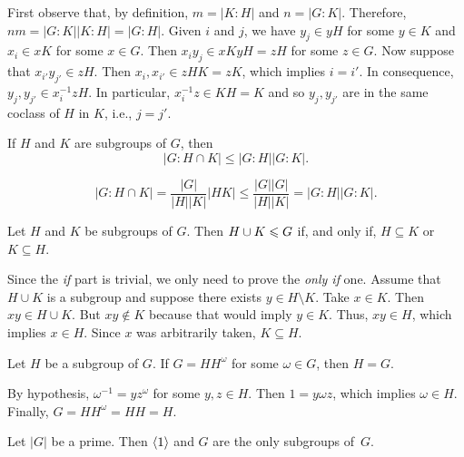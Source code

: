 \begin{solution}
    First observe that, by definition, $m=|K:H|$ and $n=|G:K|$. Therefore, $nm=|G:K||K:H|=|G:H|$. Given $i$ and $j$, we have $y_j\in yH$ for some $y\in K$ and $x_i\in xK$ for some $x\in G$. Then $x_iy_j\in xKyH=zH$ for some $z\in G$. Now suppose that $x_{i'}y_{j'}\in zH$. Then $x_i,x_{i'}\in zHK=zK$, which implies $i=i'$. In consequence, $y_j,y_{j'}\in x_i^{-1}zH$. In particular, $x_i^{-1}z\in KH=K$ and so $y_j,y_{j'}$ are in the same coclass of $H$ in $K$, i.e., $j=j'$.
\end{solution}

\begin{exr}
    If\/ $H$ and\/ $K$ are subgroups of\/ $G$, then
    $$
        |G:H\cap K|\le|G:H||G:K|.
    $$
\end{exr}

\begin{solution}
$$
    |G:H\cap K| = \frac{|G|}{|H||K|}|HK| \le \frac{|G||G|}{|H||K|}=|G:H||G:K|.
$$
 \end{solution}

\begin{exr}\label{exercise-1.1.4}
    Let\/ $H$ and\/ $K$ be subgroups of\/ $G$. Then\/ $H\cup K\leqslant G$ if, and only if,\/ $H\subseteq K$ or\/ $K\subseteq H$. 
\end{exr}

\begin{solution} Since the \textit{if\/} part is trivial, we only need to prove the \textit{only if\/} one. Assume that $H\cup K$ is a subgroup and suppose there exists $y\in H\setminus K$. Take $x\in K$. Then $xy\in H\cup K$. But $xy\notin K$ because that would imply $y\in K$. Thus, $xy\in H$, which implies $x\in H$. Since $x$ was arbitrarily taken, $K\subseteq H$.
\end{solution}

\begin{exr}\label{exercise-1.1.5}
    Let\/ $H$ be a subgroup of\/ $G$. If\/ $G=HH^\omega$ for some\/ $\omega\in G$, then\/ $H=G$.
\end{exr}

\begin{solution} By hypothesis, $\omega^{-1}=yz^\omega$ for some $y,z\in H$. Then $1=y\omega z$, which implies $\omega\in H$. Finally, $G=HH^\omega=HH=H$.
\end{solution}

\begin{exr}
    Let\/ $|G|$ be a prime. Then\/ $\langle1\rangle$ and\/ $G$ are the only subgroups of\/~$G$.
\end{exr}

